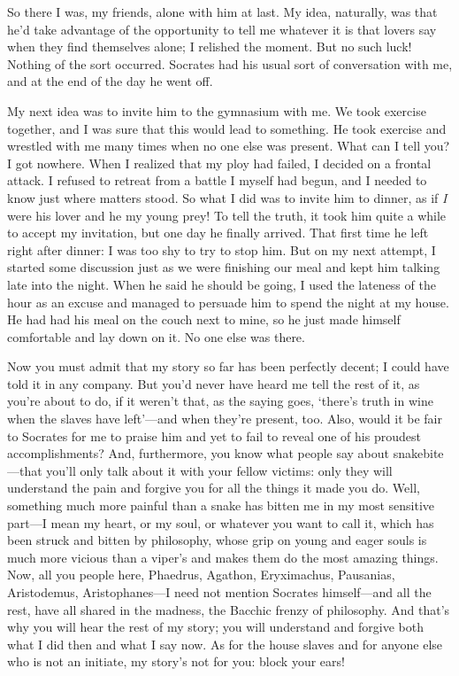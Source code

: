 So there I was, my friends, alone with him at last. My idea, naturally,
was that he'd take advantage of the opportunity to tell me whatever it
is that lovers say when they find themselves alone; I relished the
moment. But no such luck! Nothing of the sort occurred. Socrates had his
usual sort of conversation with me, and at the end of the day he went
off. 

My next idea was to invite him to the gymnasium with me. We took
exercise together, and I was sure that this would lead to something. He
took exercise and wrestled with me many times when no one else was
present. What can I tell you? I got nowhere. When I realized that my
ploy had failed, I decided on a frontal attack. I refused to retreat
from a battle I myself had begun, and I needed to know just where
matters stood. So what I did was to invite him to dinner, as if {\em I}
were his lover and he my young prey! To tell the truth, it took him
quite a while to accept my  invitation, but one day he finally
arrived. That first time he left right after dinner: I was too shy to
try to stop him. But on my next attempt, I started some discussion just
as we were finishing our meal and kept him talking late into the night.
When he said he should be going, I used the lateness of the hour as an
excuse and managed to persuade him to spend the night at my house. He
had had his meal on the couch next to mine, so he just made himself
comfortable and lay down on it. No one else was there. 

Now you must admit that my story so far has been perfectly decent; I
could have told it in any company. But you'd never have heard me tell
the rest of it, as you're about to do, if it weren't that, as the saying
goes, ‘there's truth in wine when the slaves have left'---and when
they're present, too. Also, would it be fair to Socrates for me to
praise him and yet to fail to reveal one of his proudest
accomplishments? And, furthermore, you know what people say about
snakebite---that you'll only talk about it with your fellow victims:
only they will understand the pain and forgive you for
all the things it made you do. Well, something much more painful than a
snake has bitten me in my most sensitive part---I mean my heart, or my
soul, or whatever you want to call it, which has been struck and bitten
by philosophy, whose grip on young and eager souls is much more vicious
than a viper's and makes them do the most amazing things. Now, 
all you people here, Phaedrus, Agathon, Eryximachus, Pausanias,
Aristodemus, Aristophanes---I need not mention Socrates himself---and
all the rest, have all shared in the madness, the Bacchic frenzy of
philosophy. And that's why you will hear the rest of my story; you will
understand and forgive both what I did then and what I say now. As for
the house slaves and for anyone else who is not an initiate, my story's
not for you: block your ears!

